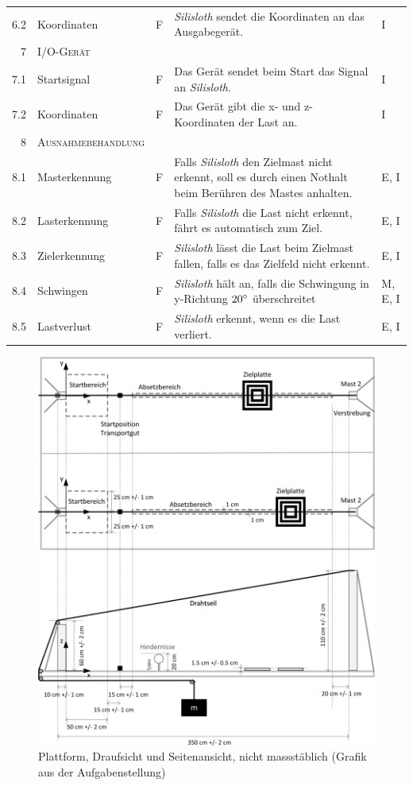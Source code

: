 \documentclass[a4paper,11pt]{scrartcl}
\begin{document}
\begin{longtable}{|r|l|l|p{7cm}|l|}
6.2 & Koordinaten & F & \textit{Silisloth} sendet die Koordinaten an das Ausgabegerät. & I \\
\textsc{7} & \textsc{I/O-Gerät} & & & \\
7.1 & Startsignal & F & Das Gerät sendet beim Start das Signal an \textit{Silisloth}. & I \\
7.2 & Koordinaten & F & Das Gerät gibt die x- und z-Koordinaten der Last an. & I \\
\textsc{8} & \textsc{Ausnahmebehandlung} & & & \\
8.1 & Masterkennung & F & Falls \textit{Silisloth} den Zielmast nicht erkennt, soll es durch einen Nothalt beim Berühren des Mastes anhalten. & E, I \\
8.2 & Lasterkennung & F & Falls \textit{Silisloth} die Last nicht erkennt, fährt es automatisch zum Ziel. & E, I \\
8.3 & Zielerkennung & F & \textit{Silisloth} lässt die Last beim Zielmast fallen, falls es das Zielfeld nicht erkennt. & E, I \\
8.4 & Schwingen & F & \textit{Silisloth} hält an, falls die Schwingung in y-Richtung $20\degree$ überschreitet & M, E, I \\
8.5 & Lastverlust & F & \textit{Silisloth} erkennt, wenn es die Last verliert. & E, I \\
\hline
\end{longtable}

\begin{figure}
    \includegraphics[width=\textwidth]{schema-plattform.png}
    \caption{Plattform, Draufsicht und Seitenansicht, nicht massstäblich (Grafik aus der Aufgabenstellung)}
\end{figure}
\end{document}
